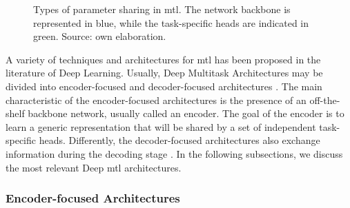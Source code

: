 \begin{figure}[ht]
\centering
{}
\hfill
{}    
\caption{Types of parameter sharing in \acl{mtl}. The network backbone is represented in blue, while the task-specific heads are indicated in green. Source: own elaboration.}
\label{fig:mtl_sharing}
\end{figure}

A variety of techniques and architectures for \acs{mtl} has been proposed in the literature of Deep Learning. Usually, Deep Multitask Architectures may be divided into encoder-focused and decoder-focused architectures \citep{vandenhende2021multi}. The main characteristic of the encoder-focused architectures \citep{kendall2018multi, chen2018gradnorm, sener2018multi} is the presence of an off-the-shelf backbone network, usually called an encoder. The goal of the encoder is to learn a generic representation that will be shared by a set of independent task-specific heads. Differently, the decoder-focused architectures also exchange information during the decoding stage \citep{xu2018pad, zhang2018joint, vandenhende2020mti}. In the following subsections, we discuss the most relevant Deep \acl{mtl} architectures.

\subsubsection{Encoder-focused Architectures}

